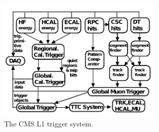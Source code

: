 \begin{figure}[hbp!]
\centering
\includegraphics[width=0.7\textwidth]{figs/CMS-TRG-12-001_Figure_002.pdf}
\caption{The CMS L1 trigger system.}
\label{fig:l1}
\end{figure}
